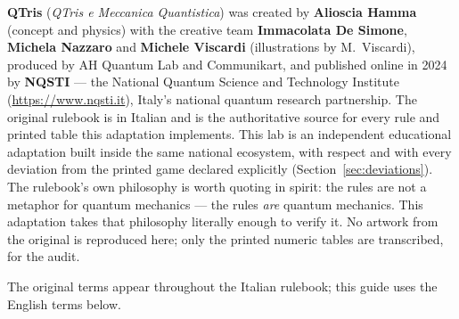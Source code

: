 \documentclass[a4paper,11pt]{article}
\begin{document}
\begin{creditsbox}
\textbf{QTris} (\emph{QTris e Meccanica Quantistica}) was created by \textbf{Alioscia
Hamma} (concept and physics) with the creative team \textbf{Immacolata De Simone},
\textbf{Michela Nazzaro} and \textbf{Michele Viscardi} (illustrations by M.~Viscardi),
produced by AH Quantum Lab and Communikart, and published online in 2024 by
\textbf{NQSTI} --- the National Quantum Science and Technology Institute
(\url{https://www.nqsti.it}), Italy's national quantum research partnership. The
original rulebook is in Italian and is the authoritative source for every rule and
printed table this adaptation implements. This lab is an independent educational
adaptation built inside the same national ecosystem, with respect and with every
deviation from the printed game declared explicitly (Section~\ref{sec:deviations}).
The rulebook's own philosophy is worth quoting in spirit: the rules are not a metaphor
for quantum mechanics --- the rules \emph{are} quantum mechanics. This adaptation takes
that philosophy literally enough to verify it. No artwork from the original is
reproduced here; only the printed numeric tables are transcribed, for the audit.
\end{creditsbox}

\noindent The original terms appear throughout the Italian rulebook; this guide uses
the English terms below.
\end{document}

